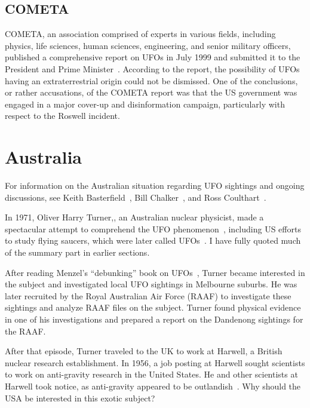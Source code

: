 \subsection{COMETA}

COMETA, an association comprised of experts in various fields, including physics, life sciences, human sciences, engineering, and senior military officers, published a comprehensive report on UFOs in July 1999 and submitted it to the President and Prime Minister~\cite{COMETA2003Jun,COMETA-English}. According to the report, the possibility of UFOs having an extraterrestrial origin could not be dismissed. One of the conclusions, or rather accusations, of the COMETA report was that the US government was engaged in a major cover-up and disinformation campaign, particularly with respect to the Roswell incident. 

\section{Australia}
\label{2023-UFO-part-Perception-types-Australia}

For information on the Australian situation regarding UFO sightings and ongoing discussions, see Keith Basterfield~\cite{Basterfield1981Jan,Basterfield-Blog}, Bill Chalker~\cite{Chalker-Ozfiles,Swords2012Jul}, and Ross Coulthart~\cite{Coulthart2021Aug}.

In 1971, Oliver Harry Turner,, an Australian nuclear physicist,
made a spectacular attempt to comprehend the UFO phenomenon~\cite{Basterfield-Blog,Swords2012Jul,Chalker22}, including US efforts to study flying saucers, which were later called UFOs~\cite{TurnerAustralia1971}.
I have fully quoted much of the summary part in earlier sections.

After reading Menzel's ``debunking'' book on UFOs~\cite{Menzel_1953}, Turner became interested in the subject and investigated local UFO sightings in Melbourne suburbs. He was later recruited by the Royal Australian Air Force (RAAF) to investigate these sightings and analyze RAAF files on the subject. Turner found physical evidence in one of his investigations and prepared a report on the Dandenong sightings for the RAAF.

After that episode, Turner traveled to the UK to work at Harwell, a British nuclear research establishment. In 1956, a job posting at Harwell sought scientists to work on anti-gravity research in the United States. He and other scientists at Harwell took notice, as anti-gravity appeared to be outlandish~\cite{Turner-bio-Chalker}. Why should the USA be interested in this exotic subject?

